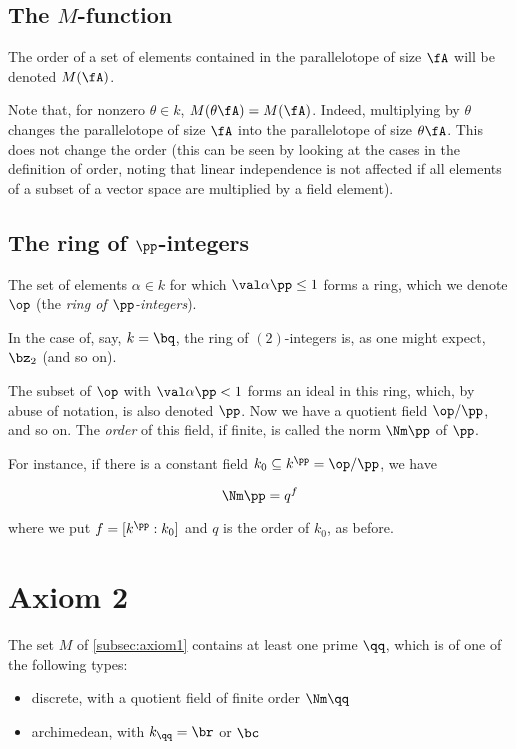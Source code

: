 \subsection{The $M$-function}
\label{sec:orgheadline17}
The order of a set of elements contained in the parallelotope of size $\fA$ will
be denoted $M(\fA)$.

Note that, for nonzero $\theta\in k$, $M(\theta\fA)=M(\fA)$.
Indeed, multiplying by $\theta$ changes the parallelotope of size $\fA$ into the
parallelotope of size $\theta\fA$. This does not change the order (this can be
seen by looking at the cases in the definition of order, noting that linear
independence is not affected if all elements of a subset of a vector space are
multiplied by a field element).

\subsection{The ring of $\pp$-integers}
\label{sec:orgheadline18}
The set of elements $\alpha\in k$ for which $\val\alpha\pp \leq 1$ forms a
ring, which we denote $\op$ (the \textit{ring of $\pp$-integers}).

In the case of, say, $k = \bq$, the ring of $(2)$-integers is, as one might
expect, $\bz_2$ (and so on).

The subset of $\op$ with $\val\alpha\pp < 1$ forms an ideal in this ring, which,
by abuse of notation, is also denoted $\pp$. Now we have a quotient field
$\op/\pp$, and so on. The \emph{order} of this field, if finite, is called the
norm $\Nm\pp$ of $\pp$.

For instance, if there is a constant field $k_0 \subseteq k^{\pp} = \op/\pp$, we
have

\[ \Nm\pp = q^f \]

where we put $f = {[k^\pp : k_0]}$ and $q$ is the order of $k_0$, as before.

\section{Axiom 2}
\label{sec:orgheadline20}
The set $M$ of \ref{subsec:axiom1} contains at least one prime $\qq$, which
is of one of the following types:
\begin{itemize}
\item discrete, with a quotient field of finite order $\Nm\qq$
\item archimedean, with $k_\qq=\br$ or $\bc$
\end{itemize}

